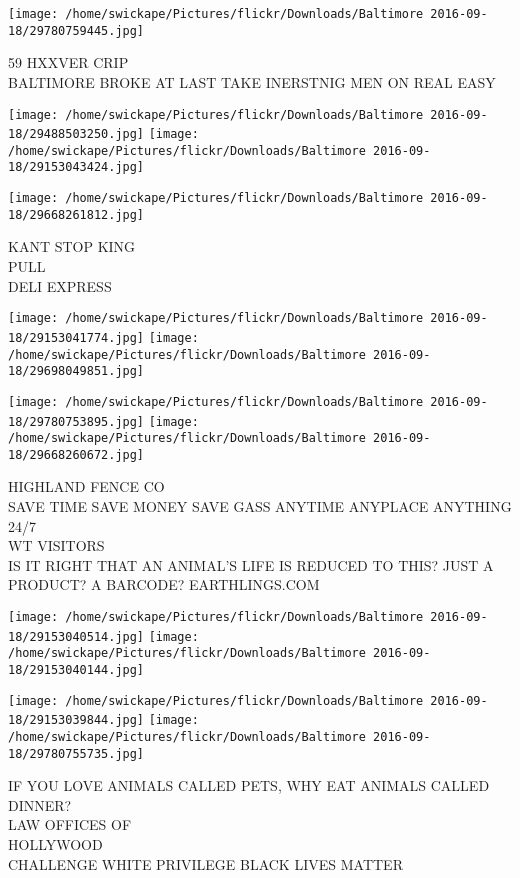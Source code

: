 \documentclass[10pt,letterpaper]{article}
\begin{document}
\vspace{0.25in}
\texttt{[image: /home/swickape/Pictures/flickr/Downloads/Baltimore 2016-09-18/29780759445.jpg]}

59 HXXVER CRIP\\
BALTIMORE BROKE AT LAST TAKE INERSTNIG MEN ON REAL EASY\\
\pagebreak

\texttt{[image: /home/swickape/Pictures/flickr/Downloads/Baltimore 2016-09-18/29488503250.jpg]}
\texttt{[image: /home/swickape/Pictures/flickr/Downloads/Baltimore 2016-09-18/29153043424.jpg]}

\vspace{0.25in}
\texttt{[image: /home/swickape/Pictures/flickr/Downloads/Baltimore 2016-09-18/29668261812.jpg]}

KANT STOP KING\\
PULL\\
DELI EXPRESS\\
\pagebreak

\texttt{[image: /home/swickape/Pictures/flickr/Downloads/Baltimore 2016-09-18/29153041774.jpg]}
\texttt{[image: /home/swickape/Pictures/flickr/Downloads/Baltimore 2016-09-18/29698049851.jpg]}

\texttt{[image: /home/swickape/Pictures/flickr/Downloads/Baltimore 2016-09-18/29780753895.jpg]}
\texttt{[image: /home/swickape/Pictures/flickr/Downloads/Baltimore 2016-09-18/29668260672.jpg]}

HIGHLAND FENCE CO\\
SAVE TIME SAVE MONEY SAVE GASS ANYTIME ANYPLACE ANYTHING 24/7\\
WT VISITORS\\
IS IT RIGHT THAT AN ANIMAL'S LIFE IS REDUCED TO THIS?  JUST A PRODUCT?  A BARCODE?  EARTHLINGS.COM\\
\pagebreak

\texttt{[image: /home/swickape/Pictures/flickr/Downloads/Baltimore 2016-09-18/29153040514.jpg]}
\texttt{[image: /home/swickape/Pictures/flickr/Downloads/Baltimore 2016-09-18/29153040144.jpg]}

\texttt{[image: /home/swickape/Pictures/flickr/Downloads/Baltimore 2016-09-18/29153039844.jpg]}
\texttt{[image: /home/swickape/Pictures/flickr/Downloads/Baltimore 2016-09-18/29780755735.jpg]}

IF YOU LOVE ANIMALS CALLED PETS, WHY EAT ANIMALS CALLED DINNER?\\
LAW OFFICES OF\\
HOLLYWOOD\\
CHALLENGE WHITE PRIVILEGE BLACK LIVES MATTER\\
\pagebreak
\end{document}

